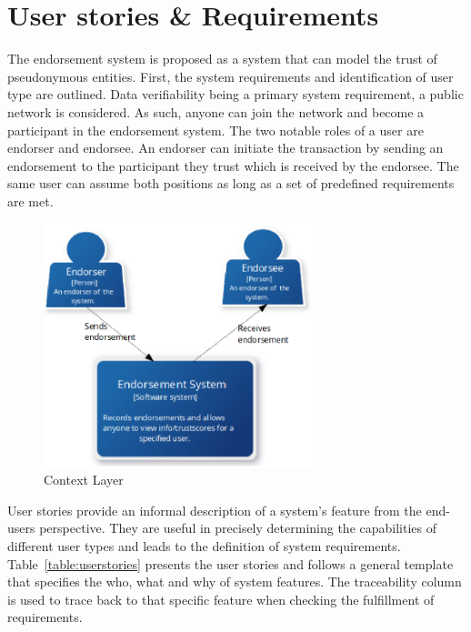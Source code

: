 \section{ User stories \& Requirements} \label{ch:UserStories}
The endorsement system is proposed as a system that can model the trust of
pseudonymous entities. First, the system requirements and identification of
user type are outlined. Data verifiability being a primary system requirement,
a public network is considered. As such, anyone can join the network and become
a participant in the endorsement system.  The two notable roles of a user are
endorser and endorsee. An endorser can initiate the transaction by sending an
endorsement to the participant they trust which is received by the endorsee.
The same user can assume both positions as long as a set of predefined
requirements are met. 
\begin{figure}
	\centering
	\includegraphics[width=0.7\textwidth]{Images/ContextLayer.eps}
	\caption{Context Layer}
	\label{fig:context}
\end{figure}
User stories provide an informal description of a system's feature from the
end-users perspective. They are useful in precisely determining the
capabilities of different user types and leads to the definition of system
requirements. Table~\ref{table:userstories} presents the user stories and
follows a general template that specifies the who, what and why of system
features. The traceability column is used to trace back to that specific
feature when checking the fulfillment of requirements. 
